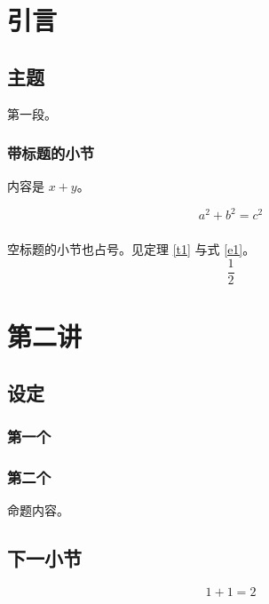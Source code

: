 \documentclass[UTF8, a4paper, 12pt, fontset=fandol, scheme=chinese]{ctexart}
\begin{document}
\setcounter{section}{-1}
\section{引言}
\subsection{主题}
第一段。
\subsubsection{带标题的小节}
\begin{theorem}[Springer]\label{t1}
内容是 $x+y$。
\end{theorem}
\begin{equation}\label{e1}
a^2+b^2=c^2
\end{equation}
\subsubsection{}
空标题的小节也占号。见定理 \ref{t1} 与式 \eqref{e1}。
\begin{equation}
\frac12
\end{equation}
\section{第二讲}
\subsection{设定}
\subsubsection{第一个}
\subsubsection{第二个}
\begin{prop}
命题内容。
\end{prop}
\subsection{下一小节}
\begin{equation}
1+1=2
\end{equation}
\end{document}
